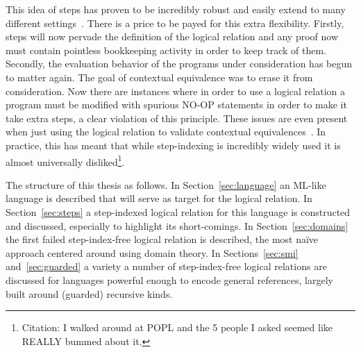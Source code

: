 This idea of steps has proven to be incredibly robust and easily
extend to many different
settings~\citep{Appel:01,Ahmed:04,Ahmed:06,Appel:07,Dreyer:09,Dreyer:10,Birkedal:steps:11,Turon:13,Svendsen:16}.
There is a price to be payed for this extra flexibility. Firstly,
steps will now pervade the definition of the logical relation and any
proof now must contain pointless bookkeeping activity in order to keep
track of them. Secondly, the evaluation behavior of the programs under
consideration has begun to matter again. The goal of contextual
equivalence was to erase it from consideration. Now there are
instances where in order to use a logical relation a program must be
modified with spurious NO-OP statements in order to make it take extra
steps, a clear violation of this principle. These issues are even
present when just using the logical relation to validate contextual
equivalences~\citep{Svendsen:16}. In practice, this has meant that
while step-indexing is incredibly widely used it is almost universally
disliked\footnote{Citation: I walked around at POPL and the 5 people I
  asked seemed like REALLY bummed about it.}.

The structure of this thesis as follows. In Section~\ref{sec:language}
an ML-like language is described that will serve as target for the
logical relation. In Section~\ref{sec:steps} a step-indexed logical
relation for this language is constructed and discussed, especially to
highlight its short-comings. In Section~\ref{sec:domains} the first
failed step-index-free logical relation is described, the most na\"ive
approach centered around using domain theory. In
Sections~\ref{sec:smi} and~\ref{sec:guarded} a variety a number of
step-index-free logical relations are discussed for languages powerful
enough to encode general references, largely built around (guarded)
recursive kinds.


